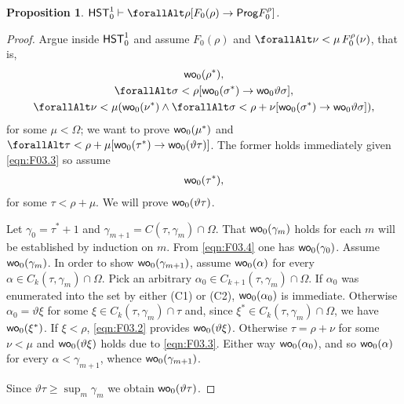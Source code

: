 \documentclass[UKenglish,cleveref,DIV=12]{scrartcl}
\let\forall\forallAlt
\newtheorem{proposition}[lemma]{Proposition}
\theoremstyle{definition}
\theoremstyle{definition}
\begin{document}
\begin{proposition}\label{extprop:F0genwellordering}
  $\HST_0^1\proves \forall\rho[F_0(\rho)\rightarrow \Prog  F_0^\rho]$.
\end{proposition}
\begin{proof}
Argue inside $\mathsf{HST}_0^1$ and assume $F_0(\rho)$ and $\forall\nu<\mu\,F_0^\rho(\nu)$, that is,
\begin{gather}
  \wo_0(\rho^*),\label{eqn:F03.1}\\
  \forall\sigma<\rho[\wo_0(\sigma^*)\rightarrow\wo_0\vartheta\sigma],\label{eqn:F03.2}\\
  \forall\nu<\mu(\wo_0(\nu^*)\land\forall\sigma<\rho+\nu[\wo_0(\sigma^*)\rightarrow \wo_0\vartheta\sigma]),\label{eqn:F03.3}
\end{gather}
for some $\mu<\Omega$; we want to prove $\mathsf{wo}_0(\mu^*)$ and $\forall\tau<\rho+\mu[\wo_0(\tau^*)\rightarrow \wo_0(\vartheta\tau)]$. The former holds immediately given \cref{eqn:F03.3} so assume
\begin{gather}
  \mathsf{wo}_0(\tau^*),\label{eqn:F03.4}
\end{gather}
for some $\tau<\rho+\mu$. We will prove $\mathsf{wo}_0(\vartheta\tau)$.

Let $\gamma_0=\tau^*+1$ and $\gamma_{m+1} = C(\tau,\gamma_m)\cap \Omega$. That $\mathsf{wo}_0(\gamma_m)$ holds for each $m$ will be established by induction on $m$. From
\cref{eqn:F03.4} one has $\mathsf{wo}_0(\gamma_0)$. Assume $\mathsf{wo}_0(\gamma_m)$. In
order to show $\mathsf{wo}_0(\gamma_{m+1})$, assume $\mathsf{wo}_0(\alpha)$ for every
$\alpha\in C_k(\tau,\gamma_m)\cap\Omega$. Pick an arbitrary $\alpha_0\in
C_{k+1}(\tau,\gamma_m)\cap\Omega$. If $\alpha_0$ was enumerated into the set by
either (C1) or (C2), $\mathsf{wo}_0(\alpha_0)$ is immediate. Otherwise
$\alpha_0=\vartheta\xi$ for some $\xi\in C_k(\tau,\gamma_m)\cap\tau$ and, since
$\xi^*\in C_k(\tau,\gamma_m)\cap\Omega$, we have $\mathsf{wo}_0(\xi^*)$. If $\xi<\rho$,
\cref{eqn:F03.2} provides $\mathsf{wo}_0(\vartheta\xi)$. Otherwise $\tau=\rho+\nu$
for some $\nu<\mu$ and $\mathsf{wo}_0(\vartheta\xi)$ holds due to \cref{eqn:F03.3}.
Either way $\mathsf{wo}_0(\alpha_0)$, and so $\mathsf{wo}_0(\alpha)$ for every
$\alpha<\gamma_{m+1}$, whence $\mathsf{wo}_0(\gamma_{m+1})$.

Since $\vartheta\tau\ge\sup_m\gamma_m$ we obtain $\mathsf{wo}_0(\vartheta\tau)$.
\end{proof}
\end{document}
